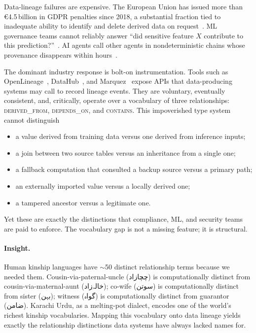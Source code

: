 \documentclass[10pt,twocolumn]{article}
\newcommand{\ur}[1]{{\urdufont #1}}
\begin{document}
Data-lineage failures are expensive. The European Union has issued more than \euro{}4.5\,billion in GDPR penalties since 2018, a substantial fraction tied to inadequate ability to identify and delete derived data on request~\cite{gdpr-fines}. ML governance teams cannot reliably answer ``did sensitive feature $X$ contribute to this prediction?''~\cite{mlflow-lineage,featurestore}. AI agents call other agents in nondeterministic chains whose provenance disappears within hours~\cite{ai-agent-provenance}.

The dominant industry response is bolt-on instrumentation. Tools such as OpenLineage~\cite{openlineage}, DataHub~\cite{datahub}, and Marquez~\cite{marquez} expose APIs that data-producing systems may call to record lineage events. They are voluntary, eventually consistent, and, critically, operate over a vocabulary of three relationships: \textsc{derived\_from}, \textsc{depends\_on}, and \textsc{contains}. This impoverished type system cannot distinguish

\begin{itemize}
\item a value derived from training data versus one derived from inference inputs;
\item a join between two source tables versus an inheritance from a single one;
\item a fallback computation that consulted a backup source versus a primary path;
\item an externally imported value versus a locally derived one;
\item a tampered ancestor versus a legitimate one.
\end{itemize}

Yet these are exactly the distinctions that compliance, ML, and security teams are paid to enforce. The vocabulary gap is not a missing feature; it is structural.

\paragraph{Insight.}
Human kinship languages have $\sim$50 distinct relationship terms because we needed them. Cousin-via-paternal-uncle (\ur{چچا‌زاد}) is computationally distinct from cousin-via-maternal-aunt (\ur{خالہ‌زاد}); co-wife (\ur{سوتن}) is computationally distinct from sister (\ur{بہن}); witness (\ur{گواہ}) is computationally distinct from guarantor (\ur{ضامن}). Karachi Urdu, as a melting-pot dialect, encodes one of the world's richest kinship vocabularies. Mapping this vocabulary onto data lineage yields exactly the relationship distinctions data systems have always lacked names for.
\end{document}
